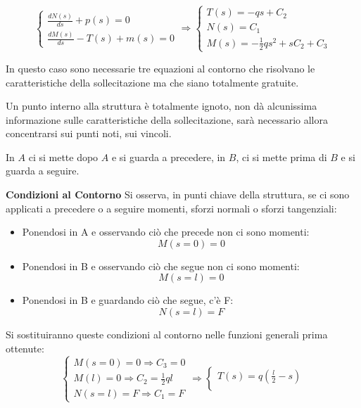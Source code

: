 \documentclass{article}
\begin{document}
\begin{adjustwidth}{2in}{}
\[\begin{cases}
		\frac{dN(s)}{ds} + p(s) = 0 \\
		
		\frac{dM(s)}{ds} - T(s) +  m(s) = 0
	\end{cases} \Rightarrow \begin{cases}
	T(s) = -qs + C_2 \\
	
	N(s) = C_1 \\
	
	M(s) = -\frac{1}{2}qs^2 + sC_2 + C_3
	\end{cases}
	\] \newline
	
	In questo caso sono necessarie tre equazioni al contorno che risolvano le caratteristiche della sollecitazione ma che siano totalmente gratuite. \newline
	
	Un punto interno alla struttura è totalmente ignoto, non dà alcunissima informazione sulle caratteristiche della sollecitazione, sarà necessario allora concentrarsi sui punti noti, sui vincoli. \newline
	
	In $A$ ci si mette dopo $A$ e si guarda a precedere, in $B$, ci si mette prima di $B$ e si guarda a seguire. \newline
	
{\Large \textbf{Condizioni al Contorno}} \mbox{} \newline	
	Si osserva, in punti chiave della struttura, se ci sono applicati a precedere o a seguire momenti, sforzi normali o sforzi tangenziali:
	
	\begin{itemize}
	\item Ponendosi in A e osservando ciò che precede non ci sono momenti: \[M(s=0) = 0\]
	\item Ponendosi in B  e osservando ciò che segue non ci sono momenti: \[M(s=l) = 0\]
	\item Ponendosi in B e guardando ciò che segue, c'è F: \[N(s=l) = F\]
	\end{itemize}
	 Si sostituiranno queste condizioni al contorno nelle funzioni generali prima ottenute: 
	 \[
	\begin{cases}
		M(s=0) = 0 \Rightarrow C_3 = 0 \\
		
		M(l) = 0 \Rightarrow C_2 = \frac{1}{2}ql\\
		
		N(s=l) = F \Rightarrow C_1 = F
	\end{cases} \Rightarrow \begin{cases}
	T(s) = q\left( \frac{l}{2} -s\right) \\
	

\end{cases}\]
\end{adjustwidth}
\end{document}
